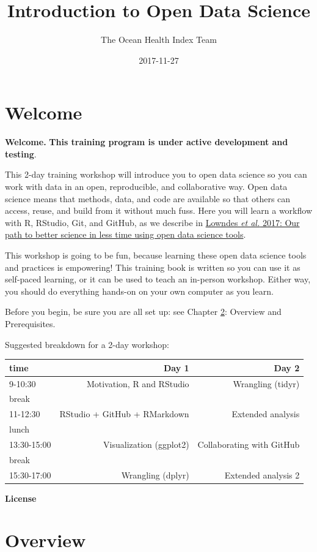 \documentclass[]{book}
\title{Introduction to Open Data Science}
\author{The Ocean Health Index Team}
\date{2017-11-27}
\theoremstyle{definition}
\theoremstyle{definition}
\theoremstyle{definition}
\theoremstyle{remark}
\begin{document}
\maketitle

{
\setcounter{tocdepth}{1}
\tableofcontents
}
\chapter{Welcome}\label{welcome}

\textbf{Welcome.} \textbf{This training program is under active
development and testing}.

This 2-day training workshop will introduce you to open data science so
you can work with data in an open, reproducible, and collaborative way.
Open data science means that methods, data, and code are available so
that others can access, reuse, and build from it without much fuss. Here
you will learn a workflow with R, RStudio, Git, and GitHub, as we
describe in
\href{https://www.nature.com/articles/s41559-017-0160}{Lowndes \emph{et
al.} 2017: Our path to better science in less time using open data
science tools}.

This workshop is going to be fun, because learning these open data
science tools and practices is empowering! This training book is written
so you can use it as self-paced learning, or it can be used to teach an
in-person workshop. Either way, you should do everything hands-on on
your own computer as you learn.

Before you begin, be sure you are all set up: see Chapter
\ref{overview}: Overview and Prerequisites.

Suggested breakdown for a 2-day workshop:

\begin{longtable}[]{@{}lrr@{}}
\toprule
time & Day 1 & Day 2\tabularnewline
\midrule
\endhead
9-10:30 & Motivation, R and RStudio & Wrangling (tidyr)\tabularnewline
break & &\tabularnewline
11-12:30 & RStudio + GitHub + RMarkdown & Extended
analysis\tabularnewline
lunch & &\tabularnewline
13:30-15:00 & Visualization (ggplot2) & Collaborating with
GitHub\tabularnewline
break & &\tabularnewline
15:30-17:00 & Wrangling (dplyr) & Extended analysis 2\tabularnewline
\bottomrule
\end{longtable}

\textbf{License}

\chapter{Overview}\label{overview}
\end{document}
